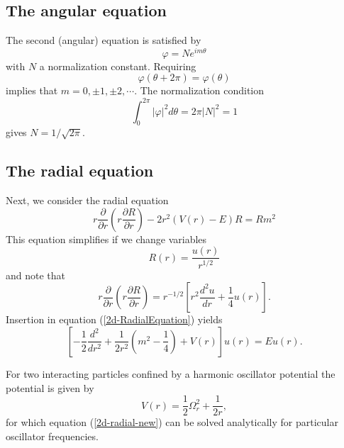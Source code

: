 \documentclass[aip,jcp,reprint,floatfix]{revtex4-1}
\begin{document}
\begin{appendices}
\subsection{The angular equation}
The second (angular) equation is satisfied by 
\begin{equation}
    \varphi = Ne^{im\theta}
\end{equation}
with $N$ a normalization constant. Requiring 
\begin{equation}
    \varphi(\theta + 2\pi) = \varphi(\theta)
\end{equation}
implies that $m=0,\pm 1, \pm 2,\cdots$. The normalization condition 
\begin{equation}
\int_0^{2\pi} |\varphi|^2 d\theta = 2\pi|N|^2 = 1    
\end{equation} gives $N = 1/\sqrt{2\pi}$.

\subsection{The radial equation}
Next, we consider the radial equation
\begin{equation}
    r\frac{\partial}{\partial r} \left( r \frac{\partial R}{\partial r} \right) -2r^2 (V(r)-E)R = Rm^2 \label{2d-RadialEquation}
    \end{equation}
This equation simplifies if we change variables
\begin{equation}
    R(r) = \frac{u(r)}{r^{1/2}}
\end{equation}
and note that 
\begin{equation}
    r\frac{\partial}{\partial r} \left( r \frac{\partial R}{\partial r} \right) = r^{-1/2} \left[ r^2 \frac{d^2 u}{dr} + \frac{1}{4}u(r) \right].
\end{equation}
Insertion in equation (\ref{2d-RadialEquation}) yields
\begin{equation}
    \left[ -\frac{1}{2} \frac{d^2}{dr^2} + \frac{1}{2r^2} \left( m^2 - \frac{1}{4} \right) + V(r) \right] u(r) = Eu(r) \label{2d-radial-new}.
\end{equation}

For two interacting particles confined by a harmonic oscillator potential the potential is given by 
\begin{equation}
    V(r) = \frac{1}{2}\Omega_r^2 + \frac{1}{2r},
\end{equation}
for which equation (\ref{2d-radial-new}) can be solved analytically for particular oscillator frequencies\cite{Taut94}. 


\end{appendices}
\end{document}
